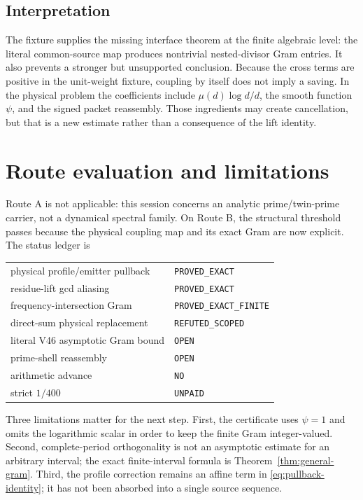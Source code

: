 \documentclass[11pt]{article}
\theoremstyle{definition}
\theoremstyle{remark}
\newcommand{\muM}{\mu}
\begin{document}
\subsection{Interpretation}

The fixture supplies the missing interface theorem at the finite algebraic
level: the literal common-source map produces nontrivial nested-divisor Gram
entries.  It also prevents a stronger but unsupported conclusion.  Because the
cross terms are positive in the unit-weight fixture, coupling by itself does
not imply a saving.  In the physical problem the coefficients include
$\muM(d)\log d/d$, the smooth function $\psi$, and the signed packet
reassembly.  Those ingredients may create cancellation, but that is a new
estimate rather than a consequence of the lift identity.

\section{Route evaluation and limitations}

Route A is not applicable: this session concerns an analytic prime/twin-prime
carrier, not a dynamical spectral family.  On Route B, the structural threshold
passes because the physical coupling map and its exact Gram are now explicit.
The status ledger is
\begin{center}
\begin{tabular}{ll}
\toprule
physical profile/emitter pullback & \texttt{PROVED\_EXACT} \\
residue-lift gcd aliasing & \texttt{PROVED\_EXACT} \\
frequency-intersection Gram & \texttt{PROVED\_EXACT\_FINITE} \\
direct-sum physical replacement & \texttt{REFUTED\_SCOPED} \\
literal V46 asymptotic Gram bound & \texttt{OPEN} \\
prime-shell reassembly & \texttt{OPEN} \\
arithmetic advance & \texttt{NO} \\
strict $1/400$ & \texttt{UNPAID} \\
\bottomrule
\end{tabular}
\end{center}

Three limitations matter for the next step.  First, the certificate uses
$\psi=1$ and omits the logarithmic scalar in order to keep the finite Gram
integer-valued.  Second, complete-period orthogonality is not an asymptotic
estimate for an arbitrary interval; the exact finite-interval formula is
Theorem~\ref{thm:general-gram}.  Third, the profile correction remains an
affine term in \eqref{eq:pullback-identity}; it has not been absorbed into a
single source sequence.
\end{document}
